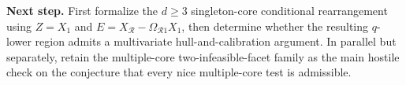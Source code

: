 \documentclass[10pt]{article}
\begin{document}
\textbf{Next step.}  First formalize the $d\ge3$ singleton-core conditional rearrangement using $Z=X_1$ and $E=X_{\mathcal R}-\Omega_{\mathcal R1}X_1$, then determine whether the resulting $q$-lower region admits a multivariate hull-and-calibration argument.  In parallel but separately, retain the multiple-core two-infeasible-facet family as the main hostile check on the conjecture that every nice multiple-core test is admissible.
\end{document}
